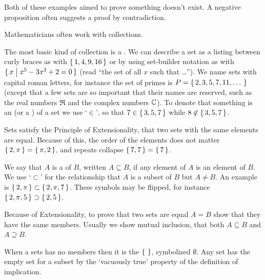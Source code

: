 Both of these examples aimed to prove something doesn't exist.
A negative proposition often suggests a proof by contradiction.















Mathematicians often work with collections. 

The most basic kind of collection is a . 
We can describe a set as a listing between curly braces as with
\( \mbox{$\{\, 1,4,9,16 \,\}$} \) or by using set-builder notation as with
\( \mbox{$\{\,x\bigm| x^5-3x^3+2=0 \,\}$} \) (read ``the set of all \( x \)
such that \ldots'').
We name sets with capital roman letters, for instance the set of primes is
\( P=\mbox{$\{\,2,3,5,7,11,\ldots\,\,\}$} \) (except that a few sets 
are so important that their names are reserved, such as the
real numbers \( \Re \)
and the complex numbers \( \mathbb{C} \)).
To denote that something is an 
(or a ) of a set we
use `\(\in \)',
so that \( 7\in\mbox{$\{\,3,5,7\,\}$} \) while \( 8\not\in\mbox{$\{\,3,5,7\,\}$} \).

Sets satisfy
the Principle of Extensionality, 
that two sets with the same elements are equal.
Because of this, the order of the elements does not matter 
\( \mbox{$\{\,2,\pi\,\}$}=\mbox{$\{\,\pi,2\,\}$} \), 
and
repeats collapse \( \mbox{$\{\,7,7\,\}$}=\mbox{$\{\,7\,\}$} \).

We say that \( A \) is a  of \( B \), written
$A\subseteq B$, if any element of $A$ is an element of $B$.
We use
`\( \subset \)' for the  %
relationship that \( A \) is a subset of \( B \) but \( A\neq B \).
An example is 
\( \mbox{$\{\,2,\pi\,\}$}\subset\mbox{$\{\,2,\pi,7\,\}$} \).
These symbols may be flipped, for instance
\( \mbox{$\{\, 2,\pi,5\,\}$}\supset\mbox{$\{\,2,5\,\}$} \).

Because of Extensionality, to prove that two sets are equal \( A=B \)
show that they have the same members.
Usually we show mutual inclusion,%
that both \( A\subseteq B \) and \( A\supseteq B \).

When a sets has no members then it is
the  \( \mbox{$\{\,\,\}$} \),
symbolized \( \emptyset \).
Any set has the empty set for a subset by the `vacuously true'
property of the definition of implication.


